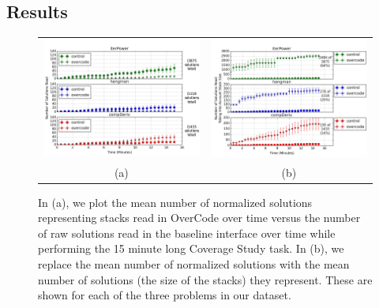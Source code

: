 \subsection{Results} \label{coverageResults}
\begin{figure}[b!]
\begin{tabular}{c | c}
\begin{minipage}{.5\linewidth}
\centering
\includegraphics[width=\linewidth]{Body/figures/overcode/prettyReadCoverage.png}
\end{minipage}
&
\begin{minipage}{.5\linewidth}
\centering
\includegraphics[width=\linewidth]{Body/figures/overcode/prettyPercentCoverage.png}
\end{minipage}
\\
(a) & (b)
\end{tabular}
\caption{In (a), we plot the mean number of normalized solutions representing stacks read in OverCode over time versus the number of raw solutions read in the baseline interface over time while performing the 15 minute long Coverage Study task. In (b), we replace the mean number of normalized solutions with the mean number of solutions (the size of the stacks) they represent. These are shown for each of the three problems in our dataset.}
\label{readCoverage}
\end{figure}
